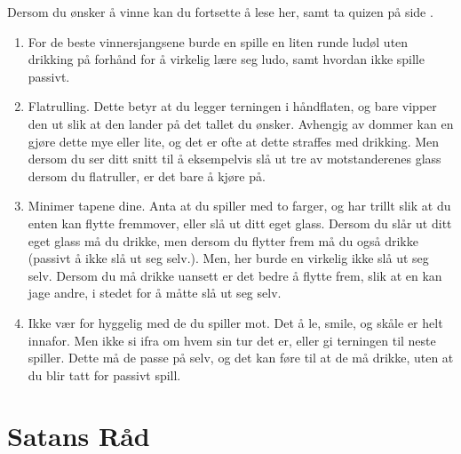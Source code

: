 \documentclass[10pt,a4paper,norsk,openany]{book}
\begin{document}
\noindent
Dersom du ønsker å vinne kan du fortsette å lese her, samt ta quizen på side
\pageref{chap:quiz}.
\begin{enumerate}
  \item For de beste
vinnersjangsene burde en spille en liten runde ludøl uten drikking på
    forhånd for å virkelig lære seg ludo, samt hvordan ikke spille passivt.
  \item Flatrulling. Dette betyr at du legger terningen i håndflaten, og bare
    vipper den ut slik at den lander på det tallet du ønsker. Avhengig av dommer
    kan en gjøre dette mye eller lite, og det er ofte at dette straffes med
    drikking. Men dersom du ser ditt snitt til å eksempelvis slå ut tre av
    motstanderenes glass dersom du flatruller, er det bare å kjøre på.
  \item Minimer tapene dine. Anta at du spiller med to farger, og har trillt
    slik at du enten kan flytte fremmover, eller slå ut ditt eget glass. Dersom
    du slår ut ditt eget glass må du drikke, men dersom du flytter frem må du også
    drikke (passivt å ikke slå ut seg selv.). Men, her burde en virkelig ikke slå
    ut seg selv. Dersom du må drikke uansett er det bedre å flytte frem, slik
    at en kan jage andre, i stedet for å måtte slå ut seg selv.
  \item Ikke vær for hyggelig med de du spiller mot. Det å le, smile, og skåle
    er helt innafor. Men ikke si ifra om hvem sin tur det er, eller gi terningen
    til neste spiller. Dette må de passe på selv, og det kan føre til at de må
    drikke, uten at du blir tatt for passivt spill. 
\end{enumerate}


\section{Satans Råd}
\end{document}
